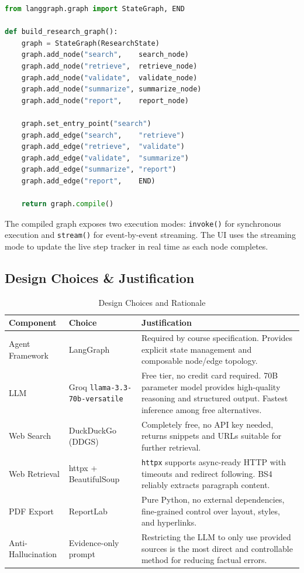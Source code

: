 \documentclass[12pt, a4paper]{article}
\begin{document}
\begin{lstlisting}[language=Python, caption=LangGraph StateGraph Definition]
from langgraph.graph import StateGraph, END

def build_research_graph():
    graph = StateGraph(ResearchState)
    graph.add_node("search",    search_node)
    graph.add_node("retrieve",  retrieve_node)
    graph.add_node("validate",  validate_node)
    graph.add_node("summarize", summarize_node)
    graph.add_node("report",    report_node)

    graph.set_entry_point("search")
    graph.add_edge("search",    "retrieve")
    graph.add_edge("retrieve",  "validate")
    graph.add_edge("validate",  "summarize")
    graph.add_edge("summarize", "report")
    graph.add_edge("report",    END)

    return graph.compile()
\end{lstlisting}

The compiled graph exposes two execution modes: \texttt{invoke()} for synchronous execution and \texttt{stream()} for event-by-event streaming. The UI uses the streaming mode to update the live step tracker in real time as each node completes.

\subsection{Design Choices \& Justification}

\begin{table}[H]
\centering
\caption{Design Choices and Rationale}
\begin{tabular}{@{}p{3.5cm}p{3.5cm}p{7cm}@{}}
\toprule
\textbf{Component} & \textbf{Choice} & \textbf{Justification} \\
\midrule
Agent Framework & LangGraph & Required by course specification. Provides explicit state management and composable node/edge topology. \\[0.4em]
LLM & Groq \texttt{llama-3.3-70b-versatile} & Free tier, no credit card required. 70B parameter model provides high-quality reasoning and structured output. Fastest inference among free alternatives. \\[0.4em]
Web Search & DuckDuckGo (DDGS) & Completely free, no API key needed, returns snippets and URLs suitable for further retrieval. \\[0.4em]
Web Retrieval & httpx + BeautifulSoup & \texttt{httpx} supports async-ready HTTP with timeouts and redirect following. BS4 reliably extracts paragraph content. \\[0.4em]
PDF Export & ReportLab & Pure Python, no external dependencies, fine-grained control over layout, styles, and hyperlinks. \\[0.4em]
Anti-Hallucination & Evidence-only prompt & Restricting the LLM to only use provided sources is the most direct and controllable method for reducing factual errors. \\
\bottomrule
\end{tabular}
\end{table}
\end{document}

